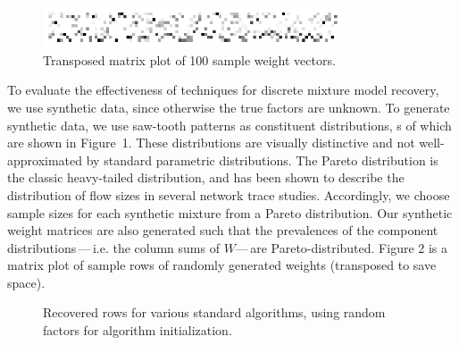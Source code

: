 \documentclass[conference]{IEEEtran}
\begin{document}
\begin{figure}[b]
\begin{center}
\includegraphics[width=3.5in]{synth/weights}
\end{center}
\vspace{-0.7em}
\caption{Transposed matrix plot of 100 sample weight vectors.}
\vspace{-0.5em}
\end{figure}

To evaluate the effectiveness of  techniques for discrete mixture model recovery, we use synthetic data, since otherwise the true factors are unknown.
To generate synthetic data, we use saw-tooth patterns as constituent distributions, s of which are shown in Figure~1.
These distributions are visually distinctive and not well-approximated by standard parametric distributions.
The Pareto distribution is the classic heavy-tailed distribution, and has been shown to describe the distribution of flow sizes in several network trace studies.
Accordingly, we choose sample sizes for each synthetic mixture from a Pareto distribution.
Our synthetic weight matrices are also generated such that the prevalences of the component distributions\,---\,i.e. the column sums of $W$---\,are Pareto-distributed. Figure 2 is a matrix plot of sample rows of randomly generated weights (transposed to save space).

\begin{figure}[t]
\begin{center}
\end{center}
\caption{Recovered rows for various standard  algorithms, using random factors for algorithm initialization.}
\end{figure}
\end{document}
